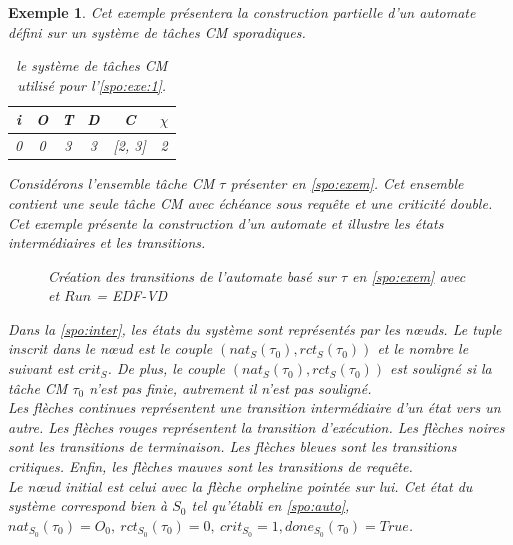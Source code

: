 \documentclass[12pt,a4paper,oneside]{book}
\theoremstyle{break}
\newtheorem{exem}{Exemple}[chapter]
\theoremstyle{breakplain}
\begin{document}
\begin{exem}
\label{spo:exe:1}
Cet exemple présentera la construction partielle d'un automate défini sur un système de tâches CM sporadiques.
\begin{table}[h]
    \centering
\begin{tabular}{|c|c|c|c|c|c|}
\hline
i &O & T & D & C & $\chi$\\
\hline
0 & 0 & 3 & 3 & [2, 3]& 2\\
\hline
\end{tabular}
    
\caption{le système de tâches CM utilisé pour l'\autoref{spo:exe:1}.}
\label{spo:exem}
\end{table}
Considérons l'ensemble tâche CM $\tau$ présenter en \autoref{spo:exem}. Cet ensemble contient une seule tâche CM avec échéance sous requête et une criticité double.\\

Cet exemple présente la construction d'un automate et illustre les états intermédiaires et les transitions.
\begin{figure}[h]
    \centering
    \resizebox{\textwidth}{!}{
    \fontsize{28pt}{12pt}\selectfont
    
    }
\caption{Création des transitions de l'automate basé sur $\tau$ en \autoref{spo:exem} avec et $Run$ = \textit{EDF-VD}}
\label{spo:inter}
\end{figure}

Dans la \autoref{spo:inter}, les états du système sont représentés par les nœuds. Le tuple inscrit dans le nœud est le couple $(nat_S(\tau_0), rct_S(\tau_0))$ et le nombre le suivant est $crit_S$. De plus, le couple $(nat_S(\tau_0), rct_S(\tau_0))$ est souligné si la tâche CM $\tau_0$ n'est pas finie, autrement il n'est pas souligné.\\

Les flèches continues représentent une transition intermédiaire d'un état vers un autre. Les flèches rouges représentent la transition d'exécution. Les flèches noires sont les transitions de terminaison. Les flèches bleues sont les transitions critiques. Enfin, les flèches mauves sont les transitions de requête.\\

Le nœud initial est celui avec la flèche orpheline pointée sur lui. Cet état du système correspond bien à $S_0$ tel qu'établi en \autoref{spo:auto}, $nat_{S_0}(\tau_0) = O_0,\ rct_{S_0}(\tau_0) = 0,\ crit_{S_0} = 1, done_{S_0}(\tau_0) = True$.\\


\end{exem}
\end{document}
